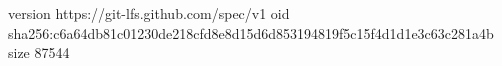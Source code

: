 version https://git-lfs.github.com/spec/v1
oid sha256:c6a64db81c01230de218cfd8e8d15d6d853194819f5c15f4d1d1e3c63c281a4b
size 87544
